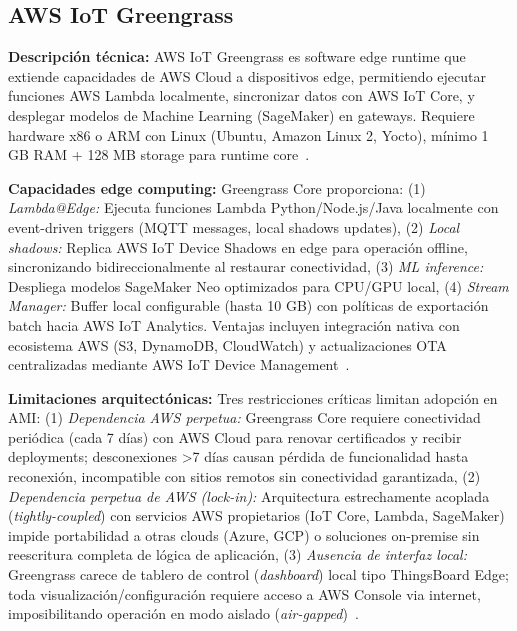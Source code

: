\subsection{AWS IoT Greengrass}
\label{sec:marco-aws-greengrass}

\textbf{Descripción técnica:} AWS IoT Greengrass es software edge runtime que extiende capacidades de AWS Cloud a dispositivos edge, permitiendo ejecutar funciones AWS Lambda localmente, sincronizar datos con AWS IoT Core, y desplegar modelos de Machine Learning (SageMaker) en gateways. Requiere hardware x86 o ARM con Linux (Ubuntu, Amazon Linux 2, Yocto), mínimo 1 GB RAM + 128 MB storage para runtime core~\cite{awsAWSIoTGreengrass2024}.

\textbf{Capacidades edge computing:} Greengrass Core proporciona: (1) \textit{Lambda@Edge:} Ejecuta funciones Lambda Python/Node.js/Java localmente con event-driven triggers (MQTT messages, local shadows updates), (2) \textit{Local shadows:} Replica AWS IoT Device Shadows en edge para operación offline, sincronizando bidireccionalmente al restaurar conectividad, (3) \textit{ML inference:} Despliega modelos SageMaker Neo optimizados para CPU/GPU local, (4) \textit{Stream Manager:} Buffer local configurable (hasta 10 GB) con políticas de exportación batch hacia AWS IoT Analytics. Ventajas incluyen integración nativa con ecosistema AWS (S3, DynamoDB, CloudWatch) y actualizaciones OTA centralizadas mediante AWS IoT Device Management~\cite{awsAWSIoTGreengrass2023}.

\textbf{Limitaciones arquitectónicas:} Tres restricciones críticas limitan adopción en AMI: (1) \textit{Dependencia AWS perpetua:} Greengrass Core requiere conectividad periódica (cada 7 días) con AWS Cloud para renovar certificados y recibir deployments; desconexiones >7 días causan pérdida de funcionalidad hasta reconexión, incompatible con sitios remotos sin conectividad garantizada, (2) \textit{Dependencia perpetua de AWS (\textit{lock-in}):} Arquitectura estrechamente acoplada (\textit{tightly-coupled}) con servicios AWS propietarios (IoT Core, Lambda, SageMaker) impide portabilidad a otras clouds (Azure, GCP) o soluciones on-premise sin reescritura completa de lógica de aplicación, (3) \textit{Ausencia de interfaz local:} Greengrass carece de tablero de control (\textit{dashboard}) local tipo ThingsBoard Edge; toda visualización/configuración requiere acceso a AWS Console via internet, imposibilitando operación en modo aislado (\textit{air-gapped})~\cite{awsAWSIoTGreengrass2024}.

